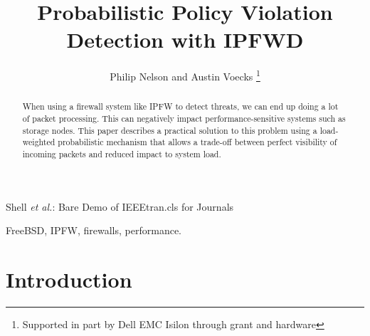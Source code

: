 \documentclass[journal]{IEEEtran}
\begin{document}
%
\title{Probabilistic Policy Violation Detection with IPFWD}

\author{Philip Nelson and Austin Voecks%
\thanks{Supported in part by Dell EMC Isilon through grant and hardware}}


%
{Shell \MakeLowercase{\textit{et al.}}: Bare Demo of IEEEtran.cls for Journals}
% 

\maketitle


\begin{abstract}
When using a firewall system like IPFW to detect threats, we can end up doing a
lot of packet processing. This can negatively impact performance-sensitive
systems such as storage nodes. This paper describes a practical solution to
this problem using a load-weighted probabilistic mechanism that allows a
trade-off between perfect visibility of incoming packets and reduced impact to
system load.  

\end{abstract}


\begin{IEEEkeywords}
FreeBSD, IPFW, firewalls, performance.
\end{IEEEkeywords}


%
\IEEEpeerreviewmaketitle


\section{Introduction}
\end{document}
